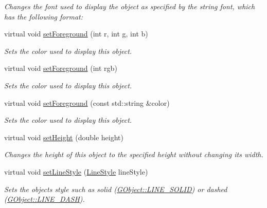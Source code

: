\begin{DoxyCompactItemize}
\begin{DoxyCompactList}\small\item\em Changes the font used to display the object as specified by the string {\ttfamily font}, which has the following format\+: \end{DoxyCompactList}\item 
virtual void \mbox{\hyperlink{classsgl_1_1GObject_ad18e8fab1e02a4e9b75c6730212558eb}{set\+Foreground}} (int r, int g, int b)
\begin{DoxyCompactList}\small\item\em Sets the color used to display this object. \end{DoxyCompactList}\item 
virtual void \mbox{\hyperlink{classsgl_1_1GObject_a9eb856b5ff83a19df3831a31f15f4563}{set\+Foreground}} (int rgb)
\begin{DoxyCompactList}\small\item\em Sets the color used to display this object. \end{DoxyCompactList}\item 
virtual void \mbox{\hyperlink{classsgl_1_1GObject_af59209aeadea6dfc6d97a2d8531f50e1}{set\+Foreground}} (const std\+::string \&color)
\begin{DoxyCompactList}\small\item\em Sets the color used to display this object. \end{DoxyCompactList}\item 
virtual void \mbox{\hyperlink{classsgl_1_1GObject_a9e280bfc4544dfaf8e4376c4e1a74357}{set\+Height}} (double height)
\begin{DoxyCompactList}\small\item\em Changes the height of this object to the specified height without changing its width. \end{DoxyCompactList}\item 
virtual void \mbox{\hyperlink{classsgl_1_1GObject_add11575087eb94f1a71faa3f826c6341}{set\+Line\+Style}} (\mbox{\hyperlink{classsgl_1_1GObject_a86e0f5648542856159bb40775c854aa7}{Line\+Style}} line\+Style)
\begin{DoxyCompactList}\small\item\em Sets the object\textquotesingle{}s style such as solid (\mbox{\hyperlink{classsgl_1_1GObject_a86e0f5648542856159bb40775c854aa7a700c78bc2cd76acaab26651bf7b4941f}{G\+Object\+::\+L\+I\+N\+E\+\_\+\+S\+O\+L\+ID}}) or dashed (\mbox{\hyperlink{classsgl_1_1GObject_a86e0f5648542856159bb40775c854aa7a9ccba0845f785d81d07b333ae1aad84e}{G\+Object\+::\+L\+I\+N\+E\+\_\+\+D\+A\+SH}}). \end{DoxyCompactList}\item 

\end{DoxyCompactItemize}
